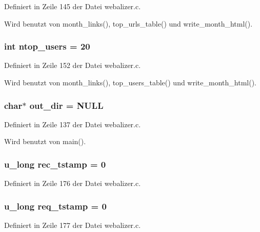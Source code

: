 Definiert in Zeile 145 der Datei webalizer.c.

Wird benutzt von month\_\-links(), top\_\-urls\_\-table() und write\_\-month\_\-html().
\subsubsection{\setlength{\rightskip}{0pt plus 5cm}int {\bf ntop\_\-users} = 20}\label{webalizer_8c_958b818c79b6fa3f2d0ab1ca4bb3e97c}




Definiert in Zeile 152 der Datei webalizer.c.

Wird benutzt von month\_\-links(), top\_\-users\_\-table() und write\_\-month\_\-html().
\subsubsection{\setlength{\rightskip}{0pt plus 5cm}char$\ast$ {\bf out\_\-dir} = NULL}\label{webalizer_8c_6910a5df32ce9909ffbacfafaa6e3645}




Definiert in Zeile 137 der Datei webalizer.c.

Wird benutzt von main().
\subsubsection{\setlength{\rightskip}{0pt plus 5cm}u\_\-long {\bf rec\_\-tstamp} = 0}\label{webalizer_8c_f385cef2f38414353e7bc598d05b76c5}




Definiert in Zeile 176 der Datei webalizer.c.
\subsubsection{\setlength{\rightskip}{0pt plus 5cm}u\_\-long {\bf req\_\-tstamp} = 0}\label{webalizer_8c_f3d950913119a2fc8ebe574b68c7174b}




Definiert in Zeile 177 der Datei webalizer.c.
